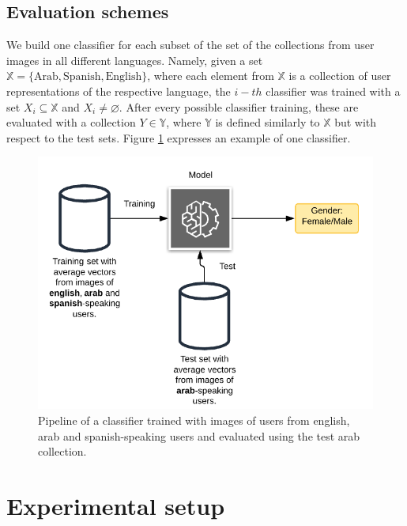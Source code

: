 \documentclass[runningheads]{llncs}
\begin{document}
\subsection{Evaluation schemes}

We build one classifier for each subset of the set of the
collections from user images in all different languages.
Namely, given a set $\mathbb{X} = \{\text{Arab}, 
\text{Spanish}, \text{English}\}$, where each element
from $\mathbb{X}$ is a collection of user representations
of the respective language, the $i-th$ classifier was trained
with a set $X_i \subseteq \mathbb{X}$ and $X_i \neq \varnothing$.
After every possible classifier training, these are evaluated with a collection 
$Y \in \mathbb{Y}$, where $\mathbb{Y}$ is defined similarly to
$\mathbb{X}$ but with respect to the test sets.
Figure \ref{fig:classifier} expresses an example of one classifier.
 
\begin{figure}[!h]
    \centering
    \includegraphics[scale=0.3]{img/classifier_scheme.png}
    \caption{Pipeline of a classifier trained with images of users 
    from english, arab and spanish-speaking users and evaluated using
    the test arab collection.}
    \label{fig:classifier}
\end{figure}


\section{Experimental setup}

\end{document}
